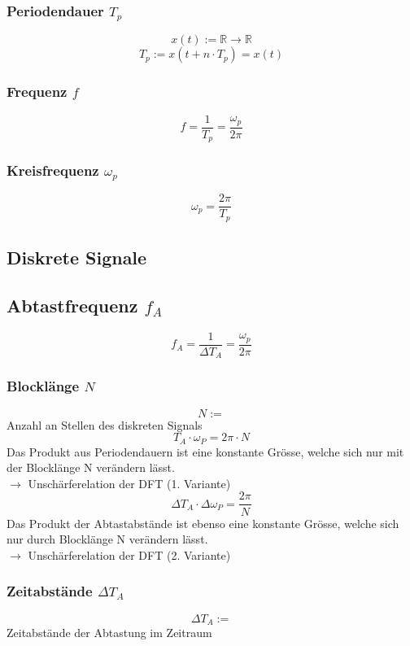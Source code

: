 \documentclass[12pt,a4paper]{scrartcl}
\begin{document}
\subsubsection{Periodendauer $T_p$}
\label{sec:sub:sub:periodendauer}
$$ x(t) := \mathbb{R} \to \mathbb{R}$$
$$T_p := x(t + n \cdot T_p) = x(t)$$
\subsubsection{Frequenz $f$}
\label{sec:sub:sub:frequenz}
$$f = \frac{1}{T_p} = \frac{\omega_p}{2\pi}$$
\subsubsection{Kreisfrequenz $\omega_p$}
\label{sec:sub:sub:periodendauer-im-spektrum-kreisfrequenz}
$$\omega_p = \frac{2\pi}{T_p}$$

\subsection{Diskrete Signale}
\label{sec:sub:const-def-diskrete-signale}

\subsection{Abtastfrequenz $f_A$}
\label{sec:sub:abtastfrequenz}
$$f_A = \frac{1}{\Delta T_A} = \frac{\omega_p}{2\pi}$$

\subsubsection{Blocklänge $N$}
\label{sec:sub:sub:blocklaenge}
$$N :=$$ Anzahl an Stellen des diskreten Signals
$$T_A \cdot \omega_P = 2\pi \cdot N$$ Das Produkt aus Periodendauern ist eine konstante Grösse, welche sich nur mit der Blocklänge N verändern lässt.\\
$\to$ Unschärferelation der DFT (1. Variante)
$$\Delta T_A \cdot \Delta \omega_P = \frac{2\pi}{N}$$ Das Produkt der Abtastabstände ist ebenso eine konstante Grösse, welche sich nur durch Blocklänge N verändern lässt.\\
$\to$ Unschärferelation der DFT (2. Variante)

\subsubsection{Zeitabstände $\Delta T_A$}
\label{sec:sub:sub:delta-t-a}
$$\Delta T_A :=$$ Zeitabstände der Abtastung im Zeitraum
\end{document}

